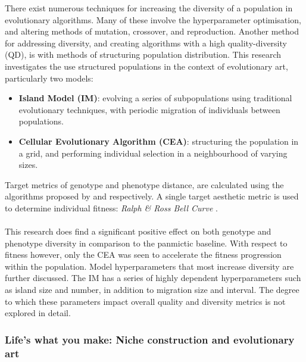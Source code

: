 \documentclass[10pt,a4paper]{article}
\begin{document}
	There exist numerous techniques for increasing the diversity of a population in evolutionary algorithms.
	Many of these involve the hyperparameter optimisation, and altering methods of mutation, crossover, and reproduction.
	Another method for addressing diversity, and creating algorithms with a high quality-diversity (QD), is with methods of structuring population distribution.
	This research investigates the use structured populations in the context of evolutionary art, particularly two models:
	\begin{itemize}
		\item \textbf{Island Model (IM)}: evolving a series of subpopulations using traditional evolutionary techniques, with periodic migration of individuals between populations.
		\item \textbf{Cellular Evolutionary Algorithm (CEA)}: structuring the population in a grid, and performing individual selection in a neighbourhood of varying sizes.
	\end{itemize}
	Target metrics of genotype and phenotype distance, are calculated using the algorithms proposed by \citep{genotype-diversity-metric} and \citep{phenotype-diversity-metric} respectively.
	A single target aesthetic metric is used to determine individual fitness: \textit{Ralph \& Ross Bell Curve} \citep{aesthetic-measures}.
	\\\\
	This research does find a significant positive effect on both genotype and phenotype diversity in comparison to the panmictic baseline.
	With respect to fitness however, only the CEA was seen to accelerate the fitness progression within the population.
	Model hyperparameters that most increase diversity are further discussed.
	The IM has a series of highly dependent hyperparameters such as island size and number, in addition to migration size and interval.
	The degree to which these parameters impact overall quality and diversity metrics is not explored in detail.
	
	\subsubsection{Life’s what you make: Niche construction and evolutionary art \citep{niche-reproduction}}
	
\end{document}
